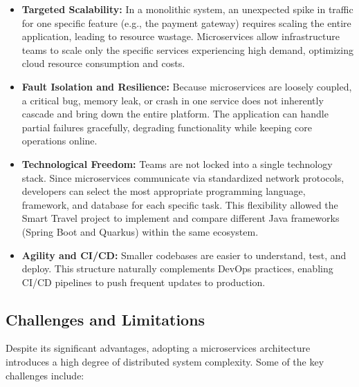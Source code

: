 \begin{itemize}
    \item \textbf{Targeted Scalability:} In a monolithic system, an unexpected spike in traffic for one specific feature (e.g., the payment gateway) requires scaling the entire application, leading to resource wastage. Microservices allow infrastructure teams to scale only the specific services experiencing high demand, optimizing cloud resource consumption and costs.
    \item \textbf{Fault Isolation and Resilience:} Because microservices are loosely coupled, a critical bug, memory leak, or crash in one service does not inherently cascade and bring down the entire platform. The application can handle partial failures gracefully, degrading functionality while keeping core operations online.
    \item \textbf{Technological Freedom:} Teams are not locked into a single technology stack. Since microservices communicate via standardized network protocols, developers can select the most appropriate programming language, framework, and database for each specific task. This flexibility allowed the Smart Travel project to implement and compare different Java frameworks (Spring Boot and Quarkus) within the same ecosystem.
    \item \textbf{Agility and CI/CD:} Smaller codebases are easier to understand, test, and deploy. This structure naturally complements DevOps practices, enabling \gls{CI/CD} pipelines to push frequent updates to production.
\end{itemize}

\subsection{Challenges and Limitations}

Despite its significant advantages, adopting a microservices architecture introduces a high degree of distributed system complexity. Some of the key challenges include:

